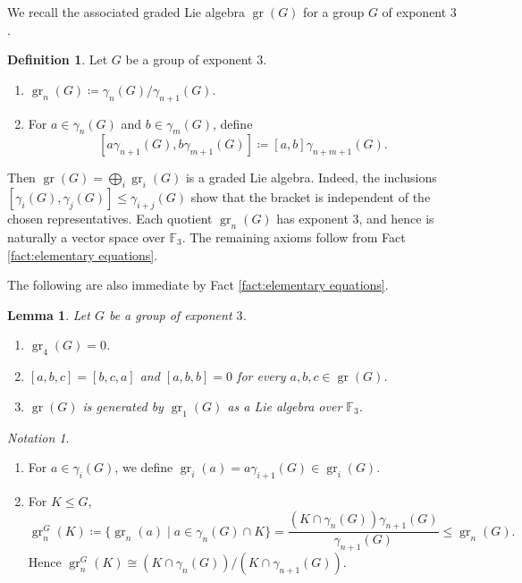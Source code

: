 \documentclass[11pt,reqno]{article}
\newtheorem{lemma}[theorem]{Lemma}
\theoremstyle{definition}
\newtheorem{definition}[theorem]{Definition}
\theoremstyle{remark}
\newtheorem{notation}[theorem]{Notation}
\DeclareMathOperator{\gr}{gr}
\begin{document}
 We recall the associated graded Lie algebra $\gr(G)$ for a group $G$ of exponent $3$.
\begin{definition}
    Let $G$ be a group of exponent $3$.
    \begin{enumerate}
        \item $\gr_n(G) \coloneqq \gamma_n(G)/\gamma_{n+1}(G)$.
        \item For $a\in\gamma_n(G)$ and $b\in\gamma_m(G)$, define
        \[
        [a\gamma_{n+1}(G),b\gamma_{m+1}(G)]
        \coloneqq [a,b]\gamma_{n+m+1}(G).
        \]
    \end{enumerate}
    Then $\gr(G)=\bigoplus_i\gr_i(G)$ is a graded Lie algebra.
    Indeed, the inclusions
    $[\gamma_i(G),\gamma_j(G)]\leq\gamma_{i+j}(G)$ show that the bracket is
    independent of the chosen representatives.
    Each quotient $\gr_n(G)$ has exponent $3$, and hence is naturally
    a vector space over $\mathbb F_3$.
    The remaining axioms follow from Fact \ref{fact:elementary equations}.
\end{definition}

The following are also immediate by Fact \ref{fact:elementary equations}.
\begin{lemma}
Let $G$ be a group of exponent $3$.
    \begin{enumerate}
        \item $\gr_4(G)=0$.
        \item $[a,b,c]=[b,c,a]$ and $[a,b,b]=0$ for every
        $a,b,c\in\gr(G)$.
        \item $\gr(G)$ is generated by $\gr_1(G)$ as a Lie algebra over
        $\mathbb F_3$.
    \end{enumerate}
\end{lemma}

\begin{notation}
    \begin{enumerate}
        \item For $a\in \gamma_i(G)$, we define
        $\gr_i(a)=a\gamma_{i+1}(G)\in\gr_i(G)$.
        \item For $K\leq G$, 
        \[
        \gr_n^G(K)
        \coloneqq
        \{\gr_n(a)\mid a\in \gamma_n(G)\cap K\}
        =
        \frac{(K\cap\gamma_n(G))\gamma_{n+1}(G)}{\gamma_{n+1}(G)}
        \leq \gr_n(G).
        \]
        Hence $\gr_n^G(K)\cong (K\cap \gamma_n(G))/(K\cap \gamma_{n+1}(G))$. 
    \end{enumerate}
\end{notation}
\end{document}

